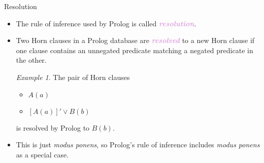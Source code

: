 \documentclass[xcolor=dvipsnames,9pt,hide notes]{beamer}
\newcommand{\join}{\ensuremath{\vee}}
\theoremstyle{definition}
\theoremstyle{remark}
\newtheorem*{ex}{Example}
\numberwithin{theorem}{section}
\numberwithin{claim}{section}
\numberwithin{equation}{section}
\numberwithin{conjecture}{section}
\newcommand{\defn}[1]{\textcolor{Plum}{\textit{\textbf{#1}}}}
\begin{document}
\begin{frame}{Resolution}
  \begin{itemize}
\item The rule of inference used by Prolog is called \defn{resolution}.\\[10pt]
\item<2->Two Horn clauses in a Prolog database are \defn{resolved} to a new
  Horn clause if one clause contains an unnegated predicate matching a negated
  predicate in the other.\\[10pt]
  \begin{ex} The pair of Horn clauses
  \begin{itemize}
  \item $A(a)$\\[5pt]
  \item $[A(a)]' \join B(b)$\\[5pt]
  \end{itemize}
  is resolved by Prolog to $B(b)$.\\[10pt]
  \end{ex}
\item <3->This is just \emph{modus ponens}, so Prolog's rule of inference
  includes \emph{modus ponens} as a special case.
\end{itemize}
\end{frame}
\end{document}
